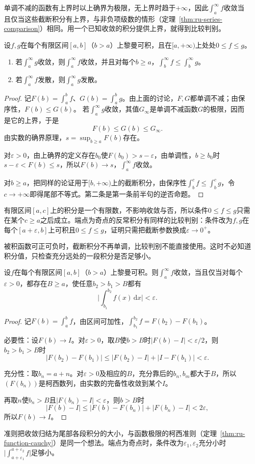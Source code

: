 单调不减的函数有上界时以上确界为极限，无上界时趋于$+\infty$，因此$\int_a^\infty f$收敛当且仅当这些截断积分有上界，与非负项级数的情形（定理~\ref{thm:ru-series-comparison}）相同。用一个已知收敛的积分提供上界，就得到比较判别。
\begin{theorem}[反常积分的比较判别]
\label{thm:ru-improper-comparison}
设$f,g$在每个有限区间$[a,b]$（$b>a$）上黎曼可积，且在$[a,+\infty)$上处处$0\leq f\leq g$。
\begin{enumerate}
 \item 若$\int_a^\infty g$收敛，则$\int_a^\infty f$收敛，并且对每个$b\geq a$，$\int_b^\infty f\leq\int_b^\infty g$。
 \item 若$\int_a^\infty f$发散，则$\int_a^\infty g$发散。
\end{enumerate}
\end{theorem}
\begin{proof}
记$F(b)=\int_a^bf$、$G(b)=\int_a^bg$。由上面的讨论，$F,G$都单调不减；由保序性，$F(b)\leq G(b)$。
若$\int_a^\infty g$收敛，其值$G_\infty$是单调不减函数$G$的极限，因而是它的上界，于是
\[
 F(b)\leq G(b)\leq G_\infty.
\]
由实数的确界原理，$s=\sup_{b\geq a}F(b)$存在。

对$\varepsilon>0$，由上确界的定义存在$b_0$使$F(b_0)>s-\varepsilon$，由单调性，$b\geq b_0$时$s-\varepsilon<F(b)\leq s$，所以$F(b)\to s$，$\int_a^\infty f$收敛。

对$b\geq a$，把同样的论证用于$[b,+\infty)$上的截断积分，由保序性$\int_b^cf\leq\int_b^cg$，令$c\to+\infty$即得尾部不等式。第二条是第一条前半句的逆否命题。
\end{proof}
有限区间$[a,c]$上的积分是一个有限数，不影响收敛与否，所以条件$0\leq f\leq g$只需在某个$c\geq a$之后成立。端点为奇点的反常积分有同样的比较判别：条件改为$f,g$在每个$[a+\varepsilon,b]$上可积且$0\leq f\leq g$，证明只需把截断参数换成$\varepsilon\to0^+$。

被积函数可正可负时，截断积分不再单调，比较判别不能直接使用。这时不必知道积分值，只检查充分远处的一段积分是否足够小。
\begin{theorem}[反常积分的柯西准则]
\label{thm:ru-improper-cauchy}
设$f$在每个有限区间$[a,b]$（$b>a$）上黎曼可积。则$\int_a^\infty f$收敛，当且仅当对每个$\varepsilon>0$，都存在$B\geq a$，使任意$b_2>b_1>B$都有
\[
 \biggl|\int_{b_1}^{b_2}f(x)\,\mathrm dx\biggr|<\varepsilon.
\]
\end{theorem}
\begin{proof}
记$F(b)=\int_a^bf$，由区间可加性，$\int_{b_1}^{b_2}f=F(b_2)-F(b_1)$。

必要性：设$F(b)\to I$。对$\varepsilon>0$，取$B$使$b>B$时$|F(b)-I|<\varepsilon/2$，则$b_2>b_1>B$时
\[
 |F(b_2)-F(b_1)|\leq|F(b_2)-I|+|I-F(b_1)|<\varepsilon.
\]

充分性：取$b_n=a+n$。对$\varepsilon>0$及相应的$B$，充分靠后的$b_n,b_m$都大于$B$，所以$(F(b_n))$是柯西数列，由实数的完备性收敛到某个$I$。

再取$n$使$b_n>B$且$|F(b_n)-I|<\varepsilon$，则$b>B$时
\[
 |F(b)-I|\leq|F(b)-F(b_n)|+|F(b_n)-I|<2\varepsilon,
\]
所以$F(b)\to I$。
\end{proof}
准则把收敛归结为尾部各段积分的大小，与函数极限的柯西准则（定理~\ref{thm:ru-function-cauchy}）是同一个想法。端点为奇点时，条件改为$\varepsilon_1,\varepsilon_2$充分小时$\bigl|\int_{a+\varepsilon_1}^{a+\varepsilon_2}f\bigr|$足够小。

